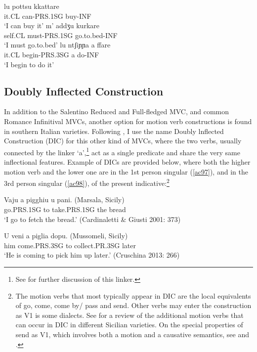 \documentclass[output=paper]{langscibook}
\begin{document}
\ea \label{ac96}
    \ea \gll lu      pottsu     kkattare\\
    it.CL can-PRS.1SG buy-INF\\
    \glt `I can buy it'
    \ex \gll m’    addʒu      kurkare\\
    self.CL  must-PRS.1SG   go.to.bed-INF \\
    \glt `I must go.to.bed'
    \ex \gll lu ntʃiɲɲa       a  ffare\\
    it.CL begin-PRS.3SG a  do-INF \\
    \glt `I begin to do it'
    \z
\z

\subsection{Doubly Inflected Construction}

In addition to the Salentino Reduced and Full-fledged MVC, and common Romance Infinitival MVCs, another option for motion verb constructions is found in southern Italian varieties. Following \cite{cruschina2013a}, I use the name Doubly lnflected Construction (DIC) for this other kind of MVCs, where the two verbs, usually connected by the linker ‘a’,\footnote{See \cite{calabrese2021a} for further discussion of this linker.}  act as a single predicate and share the very same inflectional features. Example of DICs are provided below, where both the higher motion verb and the lower one are in the 1st person singular (\ref{ac97}), and in the 3rd person singular (\ref{ac98}), of the present indicative:\footnote{The motion verbs that most typically appear in DIC are the local equivalents of go, come, come by/ pass and send. Other verbs may enter the construction as V1 is some dialects. See \cite{caro2018a, caro2019a} for a review of the additional motion verbs that can occur in DIC in different Sicilian varieties. On the special properties of send as V1, which involves both a motion and a causative semantics, see \cite{todaro2018a} and \cite{prete2020a}.}

\ea \label{ac97}
\gll Vaju    a   pigghiu    u   pani.    (Marsala, Sicily)\\
   go.PRS.1SG to   take.PRS.1SG  the  bread \\
 \glt  ‘I go to fetch the bread.’ \hfill (Cardinaletti \& Giusti 2001: 373)
\z

\ea \label{ac98}\gll  U   veni      a  piglia   dopu.      (Mussomeli, Sicily)\\
   him  come.PRS.3SG  to  collect.PR.3SG later\\
\glt   ‘He is coming to pick him up later.’ \hfill  (Cruschina 2013: 266)
\z
\end{document}
